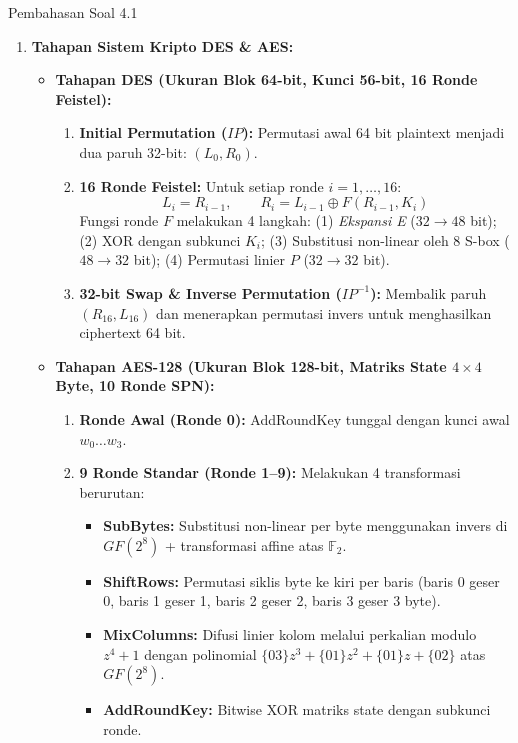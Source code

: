 \documentclass[11pt,a4paper]{article}
\begin{document}
\begin{solusibox}{Pembahasan Soal 4.1}
\begin{enumerate}[leftmargin=*]
    \item \textbf{Tahapan Sistem Kripto DES \& AES:}
    \begin{itemize}
        \item \textbf{Tahapan DES (Ukuran Blok 64-bit, Kunci 56-bit, 16 Ronde Feistel):}
        \begin{enumerate}
            \item \textbf{Initial Permutation ($IP$):} Permutasi awal 64 bit plaintext menjadi dua paruh 32-bit: $(L_0, R_0)$.
            \item \textbf{16 Ronde Feistel:} Untuk setiap ronde $i = 1, \dots, 16$:
            \[
            L_i = R_{i-1}, \qquad R_i = L_{i-1} \oplus F(R_{i-1}, K_i)
            \]
            Fungsi ronde $F$ melakukan 4 langkah: (1) \textit{Ekspansi E} ($32 \to 48$ bit); (2) XOR dengan subkunci $K_i$; (3) Substitusi non-linear oleh 8 S-box ($48 \to 32$ bit); (4) Permutasi linier $P$ ($32 \to 32$ bit).
            \item \textbf{32-bit Swap \& Inverse Permutation ($IP^{-1}$):} Membalik paruh $(R_{16}, L_{16})$ dan menerapkan permutasi invers untuk menghasilkan ciphertext 64 bit.
        \end{enumerate}
        \item \textbf{Tahapan AES-128 (Ukuran Blok 128-bit, Matriks State $4 \times 4$ Byte, 10 Ronde SPN):}
        \begin{enumerate}
            \item \textbf{Ronde Awal (Ronde 0):} AddRoundKey tunggal dengan kunci awal $w_0 \dots w_3$.
            \item \textbf{9 Ronde Standar (Ronde 1--9):} Melakukan 4 transformasi berurutan:
            \begin{itemize}
                \item \textbf{SubBytes:} Substitusi non-linear per byte menggunakan invers di $GF(2^8)$ + transformasi affine atas $\mathbb{F}_2$.
                \item \textbf{ShiftRows:} Permutasi siklis byte ke kiri per baris (baris 0 geser 0, baris 1 geser 1, baris 2 geser 2, baris 3 geser 3 byte).
                \item \textbf{MixColumns:} Difusi linier kolom melalui perkalian modulo $z^4 + 1$ dengan polinomial $\{03\}z^3 + \{01\}z^2 + \{01\}z + \{02\}$ atas $GF(2^8)$.
                \item \textbf{AddRoundKey:} Bitwise XOR matriks state dengan subkunci ronde.

\end{itemize}
\end{enumerate}
\end{itemize}
\end{enumerate}
\end{solusibox}
\end{document}
